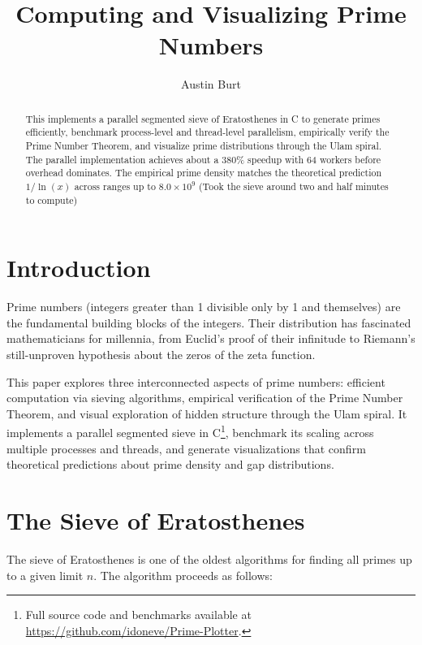\documentclass[12pt]{article}
\title{Computing and Visualizing Prime Numbers}
\author{Austin Burt}
\date{}
\theoremstyle{plain}
\theoremstyle{remark}
\theoremstyle{definition}
\begin{document}
\maketitle

\begin{abstract}
This implements a parallel segmented sieve of Eratosthenes in C to generate primes 
efficiently, benchmark process-level and thread-level parallelism, empirically 
verify the Prime Number Theorem, and visualize prime distributions through the
Ulam spiral. The parallel implementation achieves about a 380\% speedup with 64 workers before overhead dominates. The empirical prime density matches the theoretical prediction $1/\ln(x)$ across ranges up to $8.0\times10^9$ (Took the sieve around two and half minutes to compute)
\end{abstract}

\section{Introduction}

Prime numbers (integers greater than 1 divisible only by 1 and themselves) are the fundamental building blocks of the integers. Their distribution has fascinated mathematicians for millennia, from Euclid's proof of their infinitude to Riemann's still-unproven hypothesis about the zeros of the zeta function.

This paper explores three interconnected aspects of prime numbers: efficient computation via sieving algorithms, empirical verification of the Prime Number Theorem, and visual exploration of hidden structure through the Ulam spiral. It implements a parallel segmented sieve in C\footnote{Full source code and benchmarks available at \url{https://github.com/idoneve/Prime-Plotter}.}, benchmark its scaling across multiple processes and threads, and generate visualizations that confirm theoretical predictions about prime density and gap distributions.

\section{The Sieve of Eratosthenes}

The sieve of Eratosthenes is one of the oldest algorithms for finding all primes up to a given limit $n$. The algorithm proceeds as follows:
\end{document}
